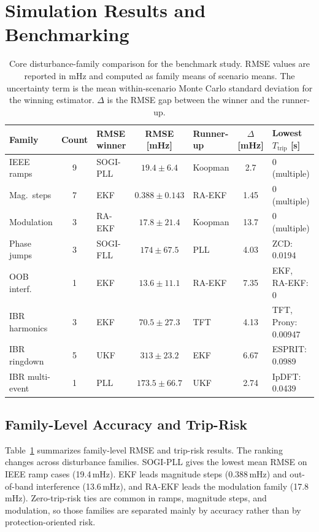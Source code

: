 \section{Simulation Results and Benchmarking}
\label{sec:results}

\begin{table}[t]
  \centering
  \caption{Core disturbance-family comparison for the benchmark study.
    RMSE values are reported in mHz and computed as family means of
    scenario means. The uncertainty term is the mean within-scenario Monte
    Carlo standard deviation for the winning estimator. $\Delta$ is the RMSE gap
    between the winner and the runner-up.}
  \label{tab:family_summary}
  \scriptsize
  \setlength{\tabcolsep}{2.8pt}
  \renewcommand{\arraystretch}{1.1}
  \begin{tabular}{l c l c l c l}
    \toprule
    Family & Count & RMSE winner & RMSE [mHz] & Runner-up & $\Delta$ [mHz] & Lowest $T_{\mathrm{trip}}$ [s] \\
    \midrule
    IEEE ramps & 9 & SOGI-PLL & $19.4 \pm 6.4$ & Koopman & 2.7 & 0 (multiple) \\
    Mag.\ steps & 7 & EKF & $0.388 \pm 0.143$ & RA-EKF & 1.45 & 0 (multiple) \\
    Modulation & 3 & RA-EKF & $17.8 \pm 21.4$ & Koopman & 13.7 & 0 (multiple) \\
    Phase jumps & 3 & SOGI-FLL & $174 \pm 67.5$ & PLL & 4.03 & ZCD: 0.0194 \\
    OOB interf. & 1 & EKF & $13.6 \pm 11.1$ & RA-EKF & 7.35 & EKF, RA-EKF: 0 \\
    IBR harmonics & 3 & EKF & $70.5 \pm 27.3$ & TFT & 4.13 & TFT, Prony: 0.00947 \\
    IBR ringdown & 5 & UKF & $313 \pm 23.2$ & EKF & 6.67 & ESPRIT: 0.0989 \\
    IBR multi-event & 1 & PLL & $173.5 \pm 66.7$ & UKF & 2.74 & IpDFT: 0.0439 \\
    \bottomrule
  \end{tabular}
\end{table}

\subsection{Family-Level Accuracy and Trip-Risk}

Table~\ref{tab:family_summary} summarizes family-level RMSE and trip-risk
results. The ranking changes across disturbance families. SOGI-PLL gives the
lowest mean RMSE on IEEE ramp cases (19.4\,mHz). EKF leads magnitude steps
(0.388\,mHz) and out-of-band interference (13.6\,mHz), and RA-EKF leads the
modulation family (17.8\,mHz). Zero-trip-risk ties are common in ramps,
magnitude steps, and modulation, so those families are separated mainly by
accuracy rather than by protection-oriented risk.

